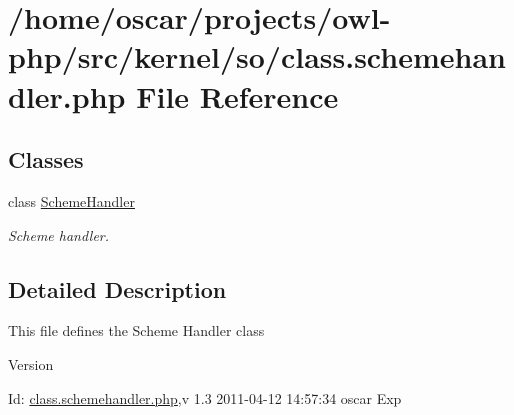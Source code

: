 \section{/home/oscar/projects/owl-\/php/src/kernel/so/class.schemehandler.php File Reference}
\label{class_8schemehandler_8php}
\subsection*{Classes}
\begin{DoxyCompactItemize}
\item 
class \hyperlink{classSchemeHandler}{SchemeHandler}
\begin{DoxyCompactList}\small\item\em Scheme handler. \item\end{DoxyCompactList}\end{DoxyCompactItemize}


\subsection{Detailed Description}
This file defines the Scheme Handler class \begin{DoxyVersion}{Version}

\end{DoxyVersion}
\begin{DoxyParagraph}{Id:}
\hyperlink{class_8schemehandler_8php}{class.schemehandler.php},v 1.3 2011-\/04-\/12 14:57:34 oscar Exp 
\end{DoxyParagraph}
